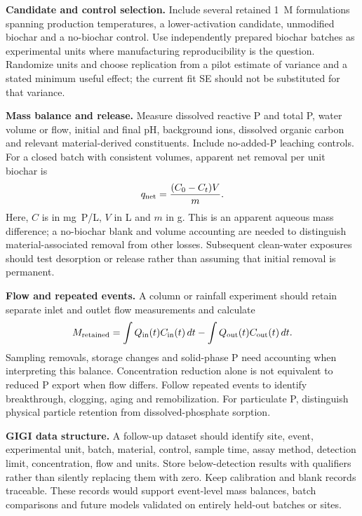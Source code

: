 \documentclass[11pt,letterpaper]{article}
\begin{document}
\textbf{Candidate and control selection.} Include several retained 1~M formulations spanning production temperatures, a lower-activation candidate, unmodified biochar and a no-biochar control. Use independently prepared biochar batches as experimental units where manufacturing reproducibility is the question. Randomize units and choose replication from a pilot estimate of variance and a stated minimum useful effect; the current fit SE should not be substituted for that variance.

\textbf{Mass balance and release.} Measure dissolved reactive P and total P, water volume or flow, initial and final pH, background ions, dissolved organic carbon and relevant material-derived constituents. Include no-added-P leaching controls. For a closed batch with consistent volumes, apparent net removal per unit biochar is
\begin{equation}
q_{\rm net}=\frac{(C_0-C_t)V}{m}.
\end{equation}
Here, $C$ is in mg~P/L, $V$ in L and $m$ in g. This is an apparent aqueous mass difference; a no-biochar blank and volume accounting are needed to distinguish material-associated removal from other losses. Subsequent clean-water exposures should test desorption or release rather than assuming that initial removal is permanent.

\textbf{Flow and repeated events.} A column or rainfall experiment should retain separate inlet and outlet flow measurements and calculate
\begin{equation}
M_{\rm retained}=\int Q_{\rm in}(t)C_{\rm in}(t)\,dt
                -\int Q_{\rm out}(t)C_{\rm out}(t)\,dt.
\end{equation}
Sampling removals, storage changes and solid-phase P need accounting when interpreting this balance. Concentration reduction alone is not equivalent to reduced P export when flow differs. Follow repeated events to identify breakthrough, clogging, aging and remobilization. For particulate P, distinguish physical particle retention from dissolved-phosphate sorption.

\textbf{GIGI data structure.} A follow-up dataset should identify site, event, experimental unit, batch, material, control, sample time, assay method, detection limit, concentration, flow and units. Store below-detection results with qualifiers rather than silently replacing them with zero. Keep calibration and blank records traceable. These records would support event-level mass balances, batch comparisons and future models validated on entirely held-out batches or sites.
\end{document}
